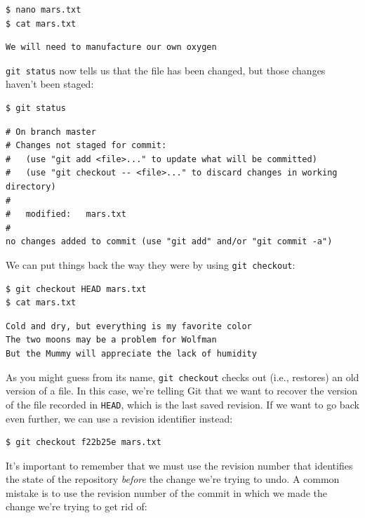 \documentclass{book}
\begin{document}
\begin{verbatim}
$ nano mars.txt
$ cat mars.txt
\end{verbatim}

\begin{verbatim}
We will need to manufacture our own oxygen
\end{verbatim}

\texttt{git status} now tells us that the file has been changed, but
those changes haven't been staged:

\begin{verbatim}
$ git status
\end{verbatim}

\begin{verbatim}
# On branch master
# Changes not staged for commit:
#   (use "git add <file>..." to update what will be committed)
#   (use "git checkout -- <file>..." to discard changes in working directory)
#
#   modified:   mars.txt
#
no changes added to commit (use "git add" and/or "git commit -a")
\end{verbatim}

We can put things back the way they were by using \texttt{git checkout}:

\begin{verbatim}
$ git checkout HEAD mars.txt
$ cat mars.txt
\end{verbatim}

\begin{verbatim}
Cold and dry, but everything is my favorite color
The two moons may be a problem for Wolfman
But the Mummy will appreciate the lack of humidity
\end{verbatim}

As you might guess from its name, \texttt{git checkout} checks out
(i.e., restores) an old version of a file. In this case, we're telling
Git that we want to recover the version of the file recorded in
\texttt{HEAD}, which is the last saved revision. If we want to go back
even further, we can use a revision identifier instead:

\begin{verbatim}
$ git checkout f22b25e mars.txt
\end{verbatim}

It's important to remember that we must use the revision number that
identifies the state of the repository \emph{before} the change we're
trying to undo. A common mistake is to use the revision number of the
commit in which we made the change we're trying to get rid of:
\end{document}
